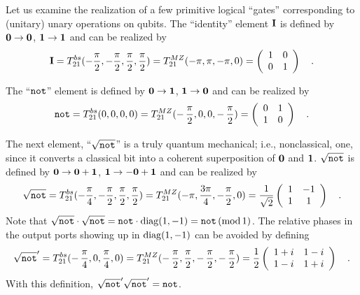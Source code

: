 \documentclass [11pt]{llncs}
\begin{document}
Let us examine the realization of a few primitive logical ``gates''
corresponding to (unitary) unary operations on qubits.
The ``identity'' element ${\bf I}$ is defined by
$ {\bf 0}  \rightarrow   {\bf 0} $,
$ {\bf 1}  \rightarrow   {\bf 1} $ and can be realized by
\begin{equation}
{\bf I} =
T^{bs}_{21}(-{\pi \over 2},-{\pi \over 2},{\pi \over 2},{\pi \over 2})=
T^{MZ}_{21}(-\pi ,\pi ,-\pi ,0)
=
\left(
\begin{array}{cc}
1&0
\\
0&1
 \end{array}
\right)
\quad .
\end{equation}

The ``${\tt not}$'' element is defined by
$ {\bf 0}  \rightarrow   {\bf 1} $,
$ {\bf 1}  \rightarrow   {\bf 0} $ and can be realized by
\begin{equation}
{\tt not} =
T^{bs}_{21}(0,0,0,0)=
T^{MZ}_{21}(-\,{\pi \over 2},0,0,-\,{\pi \over 2})
=
\left(
\begin{array}{cc}
0&1
\\
1&0
 \end{array}
\right)
\quad .
\end{equation}


The next element, ``$\sqrt{{\tt not}}$'' is a truly quantum
mechanical; i.e., nonclassical, one, since it converts a classical bit
into
a coherent superposition of $ {\bf 0} $ and $ {\bf 1} $.
$\sqrt{{\tt not}}$ is defined by
$ {\bf 0}  \rightarrow   {\bf 0}  +  {\bf 1} $,
$ {\bf 1}  \rightarrow  - {\bf 0}  +  {\bf 1} $ and can
be realized by
\begin{equation}
\sqrt{{\tt not}} =
T^{bs}_{21}(-{\pi \over 4},-{\pi \over 2},
{\pi \over 2},
{\pi \over 2})=
T^{MZ}_{21}(-\pi , {3\pi \over 4} ,-{\pi \over 2},0 )=
{1 \over \sqrt{2}}
\left(
\begin{array}{cc}
1&-1
\\
1&1
 \end{array}
\right)
\quad .
\end{equation}
Note that $\sqrt{{\tt not}}\cdot \sqrt{{\tt not}} = {\tt not}\cdot
{\rm diag}(1,-1)={\tt not}\, ({\rm mod }\, 1)$.
The relative phases in the output ports showing up in ${\rm
diag}(1,-1)$ can be avoided by defining
\begin{equation}
\sqrt{{\tt not}}' =
T^{bs}_{21}(-\,{\pi \over 4},0,
{\pi \over 4},
0)=
T^{MZ}_{21}(-\,{\pi \over 2} , {\pi \over 2} ,-\,{\pi \over 2},
-\,{\pi \over 2}
 )=
{1 \over 2}
\left(
\begin{array}{cc}
1+i&1-i
\\
1-i&1+i
 \end{array}
\right)
\quad .
\end{equation}
With this definition,
$
\sqrt{{\tt not}}'
\sqrt{{\tt not}}' = {\tt not}$.
\end{document}
